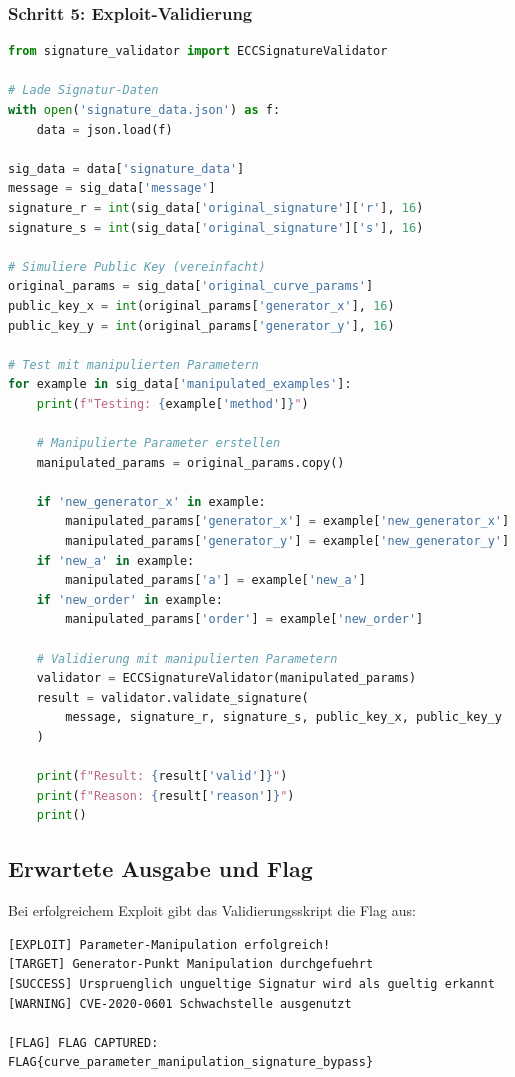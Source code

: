 \documentclass{article}
\begin{document}
\subsubsection{Schritt 5: Exploit-Validierung}

\begin{lstlisting}[language=python, caption=Vollständiger Exploit]
from signature_validator import ECCSignatureValidator

# Lade Signatur-Daten
with open('signature_data.json') as f:
    data = json.load(f)

sig_data = data['signature_data']
message = sig_data['message']
signature_r = int(sig_data['original_signature']['r'], 16)
signature_s = int(sig_data['original_signature']['s'], 16)

# Simuliere Public Key (vereinfacht)
original_params = sig_data['original_curve_params']
public_key_x = int(original_params['generator_x'], 16)
public_key_y = int(original_params['generator_y'], 16)

# Test mit manipulierten Parametern
for example in sig_data['manipulated_examples']:
    print(f"Testing: {example['method']}")
    
    # Manipulierte Parameter erstellen
    manipulated_params = original_params.copy()
    
    if 'new_generator_x' in example:
        manipulated_params['generator_x'] = example['new_generator_x']
        manipulated_params['generator_y'] = example['new_generator_y']
    if 'new_a' in example:
        manipulated_params['a'] = example['new_a']
    if 'new_order' in example:
        manipulated_params['order'] = example['new_order']
    
    # Validierung mit manipulierten Parametern
    validator = ECCSignatureValidator(manipulated_params)
    result = validator.validate_signature(
        message, signature_r, signature_s, public_key_x, public_key_y
    )
    
    print(f"Result: {result['valid']}")
    print(f"Reason: {result['reason']}")
    print()
\end{lstlisting}

\subsection{Erwartete Ausgabe und Flag}

Bei erfolgreichem Exploit gibt das Validierungsskript die Flag aus:

\begin{lstlisting}[caption=Erfolgreicher Exploit]
[EXPLOIT] Parameter-Manipulation erfolgreich!
[TARGET] Generator-Punkt Manipulation durchgefuehrt
[SUCCESS] Urspruenglich ungueltige Signatur wird als gueltig erkannt
[WARNING] CVE-2020-0601 Schwachstelle ausgenutzt

[FLAG] FLAG CAPTURED:
FLAG{curve_parameter_manipulation_signature_bypass}
\end{lstlisting}
\end{document}
